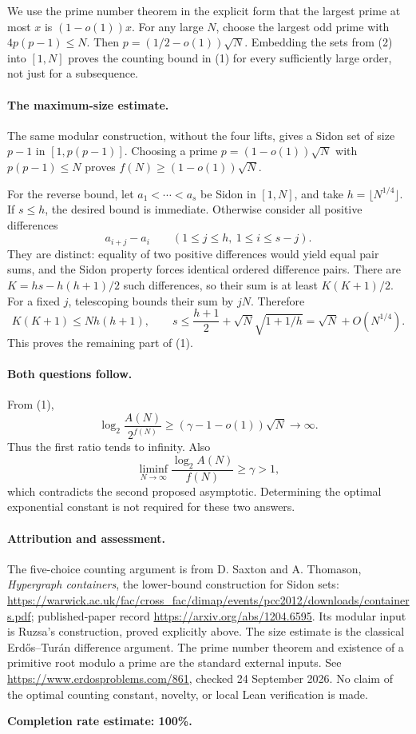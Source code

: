 We use the prime number theorem in the explicit form that the largest prime at most \(x\) is \((1-o(1))x\). For any large \(N\), choose the largest odd prime with \(4p(p-1)\leq N\). Then \(p=(1/2-o(1))\sqrt N\). Embedding the sets from (2) into \([1,N]\) proves the counting bound in (1) for every sufficiently large order, not just for a subsequence.

\paragraph{The maximum-size estimate.}
The same modular construction, without the four lifts, gives a Sidon set of size \(p-1\) in \([1,p(p-1)]\). Choosing a prime \(p=(1-o(1))\sqrt N\) with \(p(p-1)\leq N\) proves \(f(N)\geq(1-o(1))\sqrt N\).

For the reverse bound, let \(a_1<\cdots<a_s\) be Sidon in \([1,N]\), and take \(h=\lfloor N^{1/4}\rfloor\). If \(s\leq h\), the desired bound is immediate. Otherwise consider all positive differences
\[
 a_{i+j}-a_i\qquad(1\leq j\leq h,\ 1\leq i\leq s-j).
\]
They are distinct: equality of two positive differences would yield equal pair sums, and the Sidon property forces identical ordered difference pairs. There are \(K=hs-h(h+1)/2\) such differences, so their sum is at least \(K(K+1)/2\). For a fixed \(j\), telescoping bounds their sum by \(jN\). Therefore
\[
 K(K+1)\leq Nh(h+1),\qquad
 s\leq\frac{h+1}{2}+\sqrt N\sqrt{1+1/h}
 =\sqrt N+O(N^{1/4}).
\tag{3}
\]
This proves the remaining part of (1).

\paragraph{Both questions follow.}
From (1),
\[
 \log_2\frac{A(N)}{2^{f(N)}}
 \geq(\gamma-1-o(1))\sqrt N\longrightarrow\infty.
\]
Thus the first ratio tends to infinity. Also
\[
 \liminf_{N\to\infty}\frac{\log_2A(N)}{f(N)}\geq\gamma>1,
\]
which contradicts the second proposed asymptotic. Determining the optimal exponential constant is not required for these two answers.

\paragraph{Attribution and assessment.}
The five-choice counting argument is from D. Saxton and A. Thomason, \emph{Hypergraph containers}, the lower-bound construction for Sidon sets: \url{https://warwick.ac.uk/fac/cross_fac/dimap/events/pcc2012/downloads/containers.pdf}; published-paper record \url{https://arxiv.org/abs/1204.6595}. Its modular input is Ruzsa's construction, proved explicitly above. The size estimate is the classical Erd\H{o}s--Tur\'an difference argument. The prime number theorem and existence of a primitive root modulo a prime are the standard external inputs. See \url{https://www.erdosproblems.com/861}, checked 24 September 2026. No claim of the optimal counting constant, novelty, or local Lean verification is made.

\textbf{Completion rate estimate: 100\%.}
